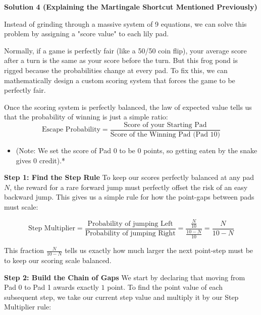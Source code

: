 \begin{enumerate}
 



\textbf{Solution 4 (Explaining the Martingale Shortcut Mentioned Previously)}

Instead of grinding through a massive system of 9 equations, we can solve this problem by assigning a "score value" to each lily pad. 

 Normally, if a game is perfectly fair (like a 50/50 coin flip), your average score after a turn is the same as your score before the turn. But this frog pond is rigged because the probabilities change at every pad. To fix this, we can mathematically design a custom scoring system that forces the game to be perfectly fair. 

 Once the scoring system is perfectly balanced, the law of expected value tells us that the probability of winning is just a simple ratio:
 \[\text{Escape Probability} = \frac{\text{Score of your Starting Pad}}{\text{Score of the Winning Pad (Pad 10)}}\]

            \begin{itemize}
        \item (Note: We set the score of Pad 0 to be 0 points, so getting eaten by the snake gives 0 credit).*
            \end{itemize}
            \textbf{Step 1: Find the Step Rule} To keep our scores perfectly balanced at any pad $N$, the reward for a rare forward jump must perfectly offset the risk of an easy backward jump. This gives us a simple rule for how the point-gaps between pads must scale:

 
 \[\text{Step Multiplier} = \frac{\text{Probability of jumping Left}}{\text{Probability of jumping Right}} = \frac{\frac{N}{10}}{\frac{10-N}{10}} = \frac{N}{10-N}\]

 This fraction $\frac{N}{10-N}$ tells us exactly how much larger the next point-step must be to keep our scoring scale balanced.

 \textbf{Step 2: Build the Chain of Gaps} We start by declaring that moving from Pad 0 to Pad 1 awards exactly $1$ point. To find the point value of each subsequent step, we take our current step value and multiply it by our Step Multiplier rule:


\end{enumerate}

